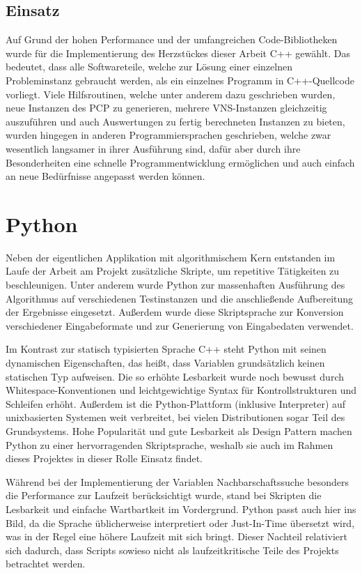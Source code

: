 \subsection{Einsatz}
Auf Grund der hohen Performance und der umfangreichen Code-Bibliotheken wurde für die Implementierung des Herzstückes dieser Arbeit C++ gewählt. Das bedeutet, dass alle Softwareteile, welche zur Lösung einer
einzelnen Probleminstanz gebraucht werden, als ein einzelnes Programm in C++-Quellcode vorliegt. Viele Hilfsroutinen, welche unter anderem dazu geschrieben wurden, neue Instanzen des PCP zu generieren, 
mehrere VNS-Instanzen gleichzeitig auszuführen und auch Auswertungen zu fertig berechneten Instanzen zu bieten, wurden hingegen in anderen Programmiersprachen geschrieben, welche zwar wesentlich langsamer
in ihrer Ausführung sind, dafür aber durch ihre Besonderheiten eine schnelle Programmentwicklung ermöglichen und auch einfach an neue Bedürfnisse angepasst werden können.

\section{Python}
\label{sec:python}
Neben der eigentlichen Applikation mit algorithmischem Kern entstanden im Laufe der Arbeit am Projekt zusätzliche Skripte, um repetitive Tätigkeiten zu beschleunigen. Unter anderem wurde Python zur massenhaften Ausführung des Algorithmus auf verschiedenen Testinstanzen und die anschließende Aufbereitung der Ergebnisse eingesetzt. Außerdem wurde diese Skriptsprache zur Konversion verschiedener Eingabeformate und zur Generierung von Eingabedaten verwendet.

Im Kontrast zur statisch typisierten Sprache C++ steht Python mit seinen dynamischen Eigenschaften, das heißt, dass Variablen grundsätzlich keinen statischen Typ aufweisen. Die so erhöhte Lesbarkeit wurde noch bewusst durch Whitespace-Konventionen und leichtgewichtige Syntax für Kontrollstrukturen und Schleifen erhöht. Außerdem ist die Python-Plattform (inklusive Interpreter) auf unixbasierten Systemen weit verbreitet, bei vielen Distributionen sogar Teil des Grundsystems. Hohe Popularität und gute Lesbarkeit als Design Pattern machen Python zu einer hervorragenden Skriptsprache, weshalb sie auch im Rahmen dieses Projektes in dieser Rolle Einsatz findet.

Während bei der Implementierung der Variablen Nachbarschaftssuche besonders die Performance zur Laufzeit berücksichtigt wurde, stand bei Skripten die Lesbarkeit und einfache Wartbartkeit im Vordergrund. Python passt auch hier ins Bild, da die Sprache üblicherweise interpretiert oder Just-In-Time übersetzt wird, was in der Regel eine höhere Laufzeit mit sich bringt. Dieser Nachteil relativiert sich dadurch, dass Scripts sowieso nicht als laufzeitkritische Teile des Projekts betrachtet werden.


